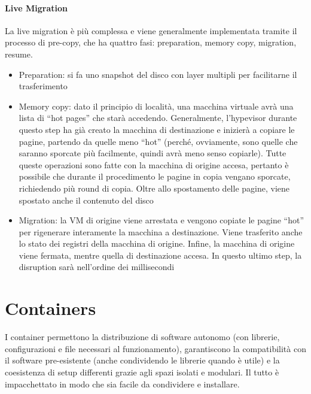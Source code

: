 \documentclass{article}
\begin{document}
		\paragraph{Live Migration}
		La live migration è più complessa e viene generalmente implementata tramite il processo di pre-copy, che ha quattro fasi: preparation, memory copy, migration, resume.
		\begin{itemize}
			\item Preparation: si fa uno snapshot del disco con layer multipli per facilitarne il
			trasferimento
			\item Memory copy: dato il principio di località, una macchina virtuale avrà una lista di
			“hot pages” che starà accedendo. Generalmente, l’hypevisor durante questo step
			ha già creato la macchina di destinazione e inizierà a copiare le pagine, partendo da quelle meno “hot” (perché, ovviamente, sono quelle che
			saranno sporcate più facilmente, quindi avrà meno senso copiarle). Tutte queste operazioni sono fatte con la macchina di origine
			accesa, pertanto è possibile che durante il procedimento le pagine in copia vengano sporcate, richiedendo più round di copia. Oltre allo spostamento delle pagine, viene spostato anche il contenuto del disco
			\item Migration: la VM di origine viene arrestata e vengono copiate le
			pagine “hot” per rigenerare interamente la macchina a destinazione. Viene trasferito
			anche lo stato dei registri della macchina di origine. Infine, la macchina di origine
			viene fermata, mentre quella di destinazione accesa. In questo ultimo step, la
			disruption sarà nell’ordine dei millisecondi
		\end{itemize}
		
		\newpage
		\section{Containers}
		I container permettono la distribuzione di software autonomo (con librerie, configurazioni e file necessari al funzionamento), garantiscono la compatibilità con il software pre-esistente (anche condividendo le librerie quando è utile) e la coesistenza di setup differenti grazie agli spazi isolati e modulari. Il tutto è impacchettato in modo che sia facile da condividere e installare.\\ 
		
\end{document}
